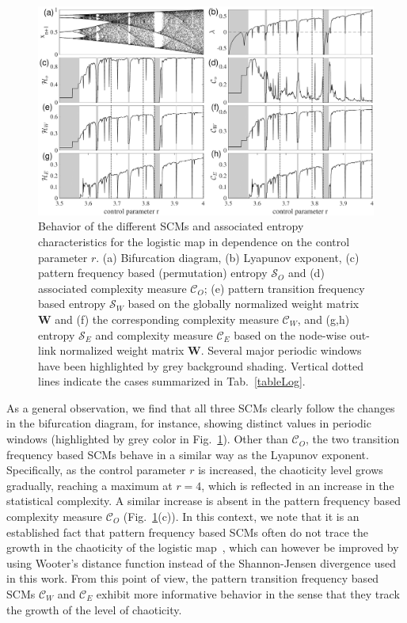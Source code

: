 \documentclass[12pt,aip,cha,reprint,nofootinbib]{revtex4-1}
\begin{document}
\begin{figure}
	\centering 
	\includegraphics[width=2\columnwidth]{logisticEntropy.pdf}
\caption{\small{Behavior of the different SCMs and associated entropy characteristics for the logistic map in dependence on the control parameter $r$. (a) Bifurcation diagram, (b) Lyapunov exponent, (c) pattern frequency based (permutation) entropy $\mathcal{S}_O$ and (d) associated complexity measure $\mathcal{C}_O$; (e) pattern transition frequency based entropy $\mathcal{S}_W$ based on the globally normalized weight matrix $\mathbf{W}$ and (f) the corresponding complexity measure $\mathcal{C}_W$, and (g,h) entropy $\mathcal{S}_E$ and complexity measure $\mathcal{C}_E$ based on the node-wise out-link normalized weight matrix $\mathbf{W}$. Several major periodic windows have been highlighted by grey background shading. Vertical dotted lines indicate the cases summarized in Tab.~\ref{tableLog}. } \label{fig:bifurcation}}
\end{figure}

As a general observation, we find that all three SCMs clearly follow the changes in the bifurcation diagram, for instance, showing distinct values in periodic windows (highlighted by grey color in Fig.~\ref{fig:bifurcation}). Other than $\mathcal{C}_O$, the two transition frequency based SCMs behave in a similar way as the Lyapunov exponent. Specifically, as the control parameter $r$ is increased, the chaoticity level grows gradually, reaching a maximum at $r = 4$, which is reflected in an increase in the statistical complexity. A similar increase is absent in the pattern frequency based complexity measure $\mathcal{C}_O$ (Fig.~\ref{fig:bifurcation}(c)). In this context, we note that it is an established fact that pattern frequency based SCMs often do not trace the growth in the chaoticity of the logistic map~\cite{MartinPLA2003}, which can however be improved by using Wooter's distance function instead of the Shannon-Jensen divergence used in this work. From this point of view, the pattern transition frequency based SCMs $\mathcal{C}_W$ and $\mathcal{C}_E$ exhibit more informative behavior in the sense that they track the growth of the level of chaoticity. 
\end{document}
